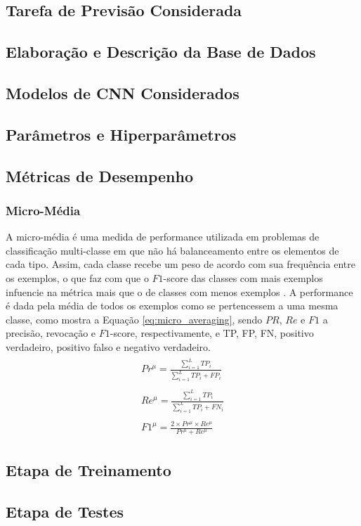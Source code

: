 
\subsection{Tarefa de Previsão Considerada}



\subsection{Elaboração e Descrição da Base de Dados}



\subsection{Modelos de CNN Considerados}
\subsection{Parâmetros e Hiperparâmetros}

\subsection{Métricas de Desempenho}

\subsubsection{Micro-Média}
A micro-média é uma medida de performance utilizada em problemas de classificação multi-classe em que não há balanceamento entre os elementos de cada tipo. Assim, cada classe recebe um peso de acordo com sua frequência entre os exemplos, o que faz com que o $F1$-score das classes com mais exemplos infuencie na métrica mais que o de classes com menos exemplos \cite{ghamrawi2005collective}. A performance é dada pela média de todos os exemplos como se pertencessem a uma mesma classe, como mostra a Equação \ref{eq:micro_averaging}, sendo $PR$, $Re$ e $F1$ a precisão, revocação e $F1$-score, respectivamente, e TP, FP, FN, positivo verdadeiro, positivo falso e negativo verdadeiro\cite{kubat2016introduction}.
\begin{align}\label{eq:micro_averaging}
	\begin{split}
		Pr^{\mu} = \frac{\sum_{i=1}^L TP_i}{\sum_{i=1}^L TP_i + FP_i}
		\\ \\
		Re^{\mu} = \frac{\sum_{i=1}^L TP_i}{\sum_{i=1}^L TP_i + FN_i}
		\\ \\
		F1^{\mu} = \frac{2 \times Pr^{\mu} \times Re^{\mu}}{Pr^{\mu} + Re^{\mu}}
	\end{split}
\end{align}

\subsection{Etapa de Treinamento}

\subsection{Etapa de Testes}
